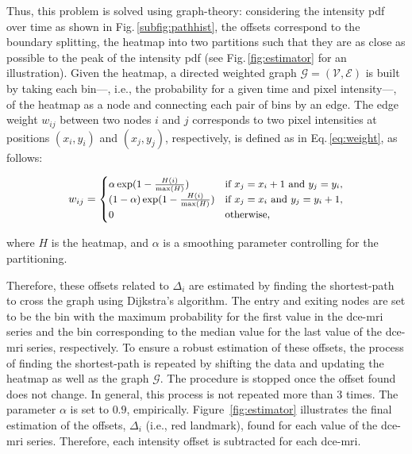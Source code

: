 \documentclass[a4paper,num-refs]{wiley-article}
\begin{document}
Thus, this problem is solved using graph-theory: considering the intensity
\ac{pdf} over time as shown in Fig.\,\ref{subfig:pathhist}, the offsets
correspond to the boundary splitting, the heatmap into two partitions such that
they are as close as possible to the peak of the intensity \ac{pdf} (see
Fig.\,\ref{fig:estimator} for an illustration). Given the heatmap, a directed
weighted graph $\mathcal{G}=(\mathcal{V}, \mathcal{E})$ is built by taking each
bin---, i.e., the probability for a given time and pixel intensity---, of the
heatmap as a node and connecting each pair of bins by an edge. The edge weight
$w_{ij}$ between two nodes $i$ and $j$ corresponds to two pixel intensities at
positions $(x_i, y_i)$ and $(x_j, y_j)$, respectively, is defined as in
Eq.\,\eqref{eq:weight}, as follows:

\begin{equation}\small
  w_{ij} = \begin{cases}
    \alpha \exp(1 - \frac{H(i)}{\max(H)})       & \text{if } x_j = x_i + 1 \text{ and } y_j = y_i, \\
    (1 - \alpha) \exp(1 - \frac{H(i)}{\max(H)}) & \text{if } x_j = x_i \text{ and } y_j = y_i + 1, \\
    0                                           & \text{otherwise},
  \end{cases}
  \label{eq:weight}
\end{equation}

\noindent where $H$ is the heatmap, and $\alpha$ is a smoothing parameter
controlling for the partitioning.

Therefore, these offsets related to $\Delta_i$ are estimated by finding the
shortest-path to cross the graph using Dijkstra's algorithm.  The entry and
exiting nodes are set to be the bin with the maximum probability for the first
value in the \ac{dce}-\ac{mri} series and the bin corresponding to the median
value for the last value of the \ac{dce}-\ac{mri} series, respectively.  To
ensure a robust estimation of these offsets, the process of finding the
shortest-path is repeated by shifting the data and updating the heatmap as well
as the graph $\mathcal{G}$. The procedure is stopped once the offset found does
not change. In general, this process is not repeated more than 3 times.  The
parameter $\alpha$ is set to $0.9$, empirically. Figure~\ref{fig:estimator}
illustrates the final estimation of the offsets, $\Delta_i$ (i.e., red
landmark), found for each value of the \ac{dce}-\ac{mri} series.  Therefore,
each intensity offset is subtracted for each \ac{dce}-\ac{mri}.
\end{document}
